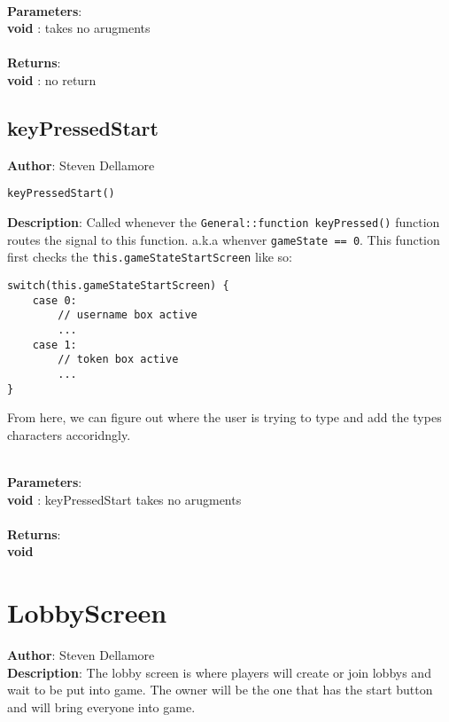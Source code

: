 \documentclass[12pt]{article}
\begin{document}
\textbf{\large{\\Parameters}}:\\
\textbf{void }: takes no arugments\\\textbf{\large{\\Returns}}:\\
\textbf{void }: no return\\

\subsection{keyPressedStart}
\textbf{Author}: Steven Dellamore 
\vspace*{1\baselineskip}
\begin{lstlisting}
keyPressedStart()
\end{lstlisting} 
\vspace*{1\baselineskip}
\textbf{Description}: Called whenever the \texttt{General::function keyPressed()} function routes the signal to this function. a.k.a whenver \texttt{gameState == 0}. This function first checks the \texttt{this.gameStateStartScreen} like so: 
\begin{verbatim}
switch(this.gameStateStartScreen) {
    case 0:
        // username box active
        ...
    case 1:
        // token box active
        ...
}
\end{verbatim}
 From here, we can figure out where the user is trying to type and add the types characters accoridngly. 


\textbf{\large{\\Parameters}}:\\
\textbf{void }: keyPressedStart takes no arugments\\\textbf{\large{\\Returns}}:\\
\textbf{void}

\section{LobbyScreen}
\textbf{Author}: Steven Dellamore \\
\textbf{Description}: The lobby screen is where players will create or join lobbys and wait to be put into game. The owner will be the one that has the start button and will bring everyone into game. \\
\end{document}
